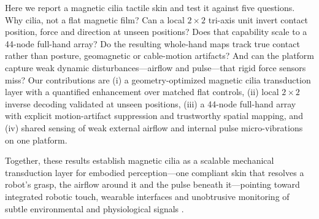 Here we report a magnetic cilia tactile skin and test it against five questions.
Why cilia, not a flat magnetic film? Can a local $2\times2$ tri-axis unit invert
contact position, force and direction at unseen positions? Does that capability
scale to a 44-node full-hand array? Do the resulting whole-hand maps track true
contact rather than posture, geomagnetic or cable-motion artifacts? And can the
platform capture weak dynamic disturbances---airflow and pulse---that rigid force
sensors miss? Our contributions are (i) a geometry-optimized magnetic cilia
transduction layer with a quantified enhancement over matched flat controls,
(ii) local $2\times2$ inverse decoding validated at unseen positions,
(iii) a 44-node full-hand array with explicit motion-artifact suppression and
trustworthy spatial mapping, and (iv) shared sensing of weak external airflow
and internal pulse micro-vibrations on one platform.

Together, these results establish magnetic cilia as a scalable mechanical
transduction layer for embodied perception---one compliant skin that resolves a
robot's grasp, the airflow around it and the pulse beneath it---pointing toward
integrated robotic touch, wearable interfaces and unobtrusive monitoring of
subtle environmental and physiological signals .
